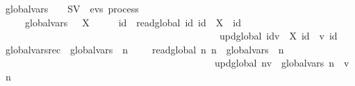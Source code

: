 \begin{isabellebody}
\ global{\isacharunderscore}{\kern0pt}vars\ {\isacharcolon}{\kern0pt}{\isacharcolon}{\kern0pt}\ {\isacartoucheopen}{\isasymsigma}\ {\isasymRightarrow}\ SV\ {\isasymRightarrow}\ evs\ process{\isacartoucheclose}\ \isanewline
\ \ \ \ \ {\isacartoucheopen}global{\isacharunderscore}{\kern0pt}vars\ {\isasymequiv}\ {\isasymmu}\ X{\isachardot}{\kern0pt}\ \ \ {\isacharparenleft}{\kern0pt}{\isasymlambda}\ {\isasymsigma}{\isachardot}{\kern0pt}\ {\isacharparenleft}{\kern0pt}{\isasymlambda}\ id{\isachardot}{\kern0pt}\ \ {\isacharparenleft}{\kern0pt}{\isacharparenleft}{\kern0pt}read\isactrlsub g\isactrlsub l\isactrlsub o\isactrlsub b\isactrlsub a\isactrlsub l\ id{\isacharparenright}{\kern0pt}\isactrlbold {\isacharbang}{\kern0pt}{\isacharparenleft}{\kern0pt}{\isasymsigma}\ id{\isacharparenright}{\kern0pt}\ {\isasymrightarrow}\ X\ {\isasymsigma}\ id\ {\isacharparenright}{\kern0pt}\ \isanewline
\ \ \ \ \ \ \ \ \ \ \ \ \ \ \ \ \ \ \ \ \ \ \ \ \ \ \ \ \ \ \ \ \ \ \ \ \ \ \ \ \ \ \ \ {\isasymbox}\ {\isacharparenleft}{\kern0pt}{\isacharparenleft}{\kern0pt}upd\isactrlsub g\isactrlsub l\isactrlsub o\isactrlsub b\isactrlsub a\isactrlsub l\ id{\isacharparenright}{\kern0pt}\isactrlbold {\isacharquery}{\kern0pt}v\ {\isasymrightarrow}\ X\ {\isacharparenleft}{\kern0pt}{\isasymsigma}{\isacharparenleft}{\kern0pt}id\ {\isacharcolon}{\kern0pt}{\isacharequal}{\kern0pt}\ v{\isacharparenright}{\kern0pt}{\isacharparenright}{\kern0pt}\ id\ {\isacharparenright}{\kern0pt}{\isacharparenright}{\kern0pt}{\isacharparenright}{\kern0pt}{\isacartoucheclose}\isanewline
\isanewline
\isanewline
{}\isamarkupfalse%
\ global{\isacharunderscore}{\kern0pt}vars{\isacharunderscore}{\kern0pt}rec\ {\isacharcolon}{\kern0pt}\ {\isacartoucheopen}global{\isacharunderscore}{\kern0pt}vars\ {\isasymsigma}\ n\ {\isacharequal}{\kern0pt}\ \ \ \ {\isacharparenleft}{\kern0pt}{\isacharparenleft}{\kern0pt}read\isactrlsub g\isactrlsub l\isactrlsub o\isactrlsub b\isactrlsub a\isactrlsub l\ n{\isacharparenright}{\kern0pt}\isactrlbold {\isacharbang}{\kern0pt}{\isacharparenleft}{\kern0pt}{\isasymsigma}\ n{\isacharparenright}{\kern0pt}\ {\isasymrightarrow}\ global{\isacharunderscore}{\kern0pt}vars\ {\isasymsigma}\ n{\isacharparenright}{\kern0pt}\ \isanewline
\ \ \ \ \ \ \ \ \ \ \ \ \ \ \ \ \ \ \ \ \ \ \ \ \ \ \ \ \ \ \ \ \ \ \ \ \ \ \ \ \ \ \ {\isasymbox}\ {\isacharparenleft}{\kern0pt}{\isacharparenleft}{\kern0pt}upd\isactrlsub g\isactrlsub l\isactrlsub o\isactrlsub b\isactrlsub a\isactrlsub l\ n{\isacharparenright}{\kern0pt}\isactrlbold {\isacharquery}{\kern0pt}v\ {\isasymrightarrow}\ global{\isacharunderscore}{\kern0pt}vars\ {\isacharparenleft}{\kern0pt}{\isasymsigma}{\isacharparenleft}{\kern0pt}n\ {\isacharcolon}{\kern0pt}{\isacharequal}{\kern0pt}\ v{\isacharparenright}{\kern0pt}{\isacharparenright}{\kern0pt}\ n{\isacharparenright}{\kern0pt}{\isacartoucheclose}\ \isanewline

\end{isabellebody}
